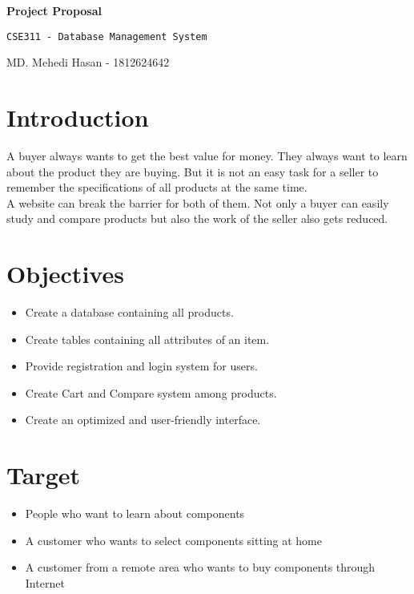 \documentclass[12pt]{article}
\begin{document}
\begin{center}
\LARGE{{\textbf{\textsf{}Project Proposal\textbf{}}}}
\end{center}

\begin{center}
\Large{\texttt{CSE311 - Database Management System}}
\end{center}

\begin{center}
\large MD. Mehedi Hasan - \large 1812624642
\end{center}

\section*{Introduction}

A buyer always wants to get the best value for money. They always want to learn about the product they are buying. But it is not an easy task for a seller to remember the specifications of all products at the same time. \\
A website can break the barrier for both of them. Not only a buyer can easily study and compare products but also the work of the seller also gets reduced.

\section*{Objectives}
\begin{itemize}
\item  Create a database containing all products. 
\item  Create tables containing all attributes of an item. 
\item  Provide registration and login system for users.
\item  Create Cart and Compare system among products. 
\item  Create an optimized and user-friendly interface.
\end{itemize}

\section*{Target}
\begin{itemize}
\item  People who want to learn about components
\item  A customer who wants to select components sitting at home
\item  A customer from a remote area who wants to buy components through Internet
\end{itemize}
\end{document}
